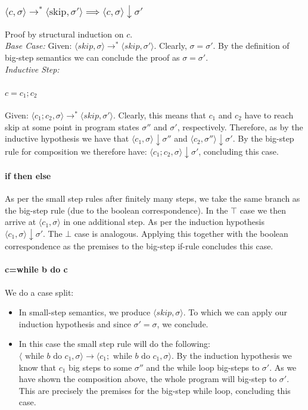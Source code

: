 \subsubsection{$ \langle c, \sigma \rangle \rightarrow^{*} \langle \text{skip}, \sigma'\rangle \implies \langle c, \sigma \rangle \downarrow \sigma'$}
Proof by structural induction on $c$. \\
\textit{Base Case:} Given: $\langle skip, \sigma \rangle \to^{*} \langle skip, \sigma' \rangle$. Clearly, $\sigma=\sigma'$. By the definition of big-step semantics we can conclude the proof as $\sigma=\sigma'$. \\
\textit{Inductive Step:} 
\paragraph{$c=c_1;c_2$}
Given: $\langle c_1;c_2, \sigma \rangle \to^{*} \langle skip, \sigma' \rangle$. Clearly, this means that $c_1$ and $c_2$ have to reach skip at some point in program states $\sigma''$ and $\sigma'$, respectively. Therefore, as by the inductive hypothesis we have that $\langle c_1, \sigma \rangle \downarrow \sigma''$ and $\langle c_2, \sigma'' \rangle \downarrow \sigma'$. By the big-step rule for composition we therefore have:
$\langle c_1;c_2, \sigma \rangle \downarrow \sigma'$, concluding this case.
\paragraph{if then else}
As per the small step rules after finitely many steps, we take the same branch as the big-step rule (due to the boolean correspondence). In the $\top$ case we then arrive at $\langle c_1, \sigma \rangle$ in one additional step. As per the induction hypothesis $\langle c_1, \sigma \rangle \downarrow \sigma'$. The $\bot$ case is analogous. Applying this together with the boolean correspondence as the premises to the big-step if-rule concludes this case.

\paragraph{c=while b do c}
We do a case split:
\begin{itemize}
    \item[$\bot$:] In small-step semantics, we produce $\langle skip, \sigma \rangle$. To which we can apply our induction hypothesis and since $\sigma'=\sigma$, we conclude.
    \item[$\top$:] In this case the small step rule will do the following:
    $\langle\text{ while }b\text{ do }c_1, \sigma \rangle \to \langle c_1; \text{ while }b \text{ do } c_1, \sigma \rangle $. By the induction hypothesis we know that $c_1$ big steps to some $\sigma''$ and the while loop big-steps to $\sigma'$. As we have shown the composition above, the whole program will big-step to $\sigma'$. This are precisely the premises for the big-step while loop, concluding this case.
\end{itemize}
